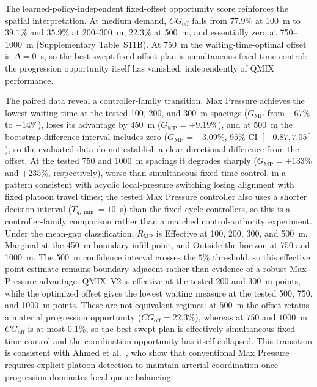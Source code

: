 \documentclass[review,12pt]{elsarticle}
\begin{document}
The learned-policy-independent fixed-offset opportunity score reinforces the spatial interpretation. At medium demand, $CG_{\mathrm{off}}$ falls from $77.9\%$ at 100~m to $39.1\%$ and $35.9\%$ at 200--300~m, $22.3\%$ at 500~m, and essentially zero at 750--1000~m (Supplementary Table~S11B). At 750~m the waiting-time-optimal offset is $\Delta=0$~s, so the best swept fixed-offset plan is simultaneous fixed-time control: the progression opportunity itself has vanished, independently of QMIX performance.

The paired data reveal a controller-family transition. Max Pressure achieves the lowest waiting time at the tested 100, 200, and 300~m spacings ($G_{\mathrm{MP}}$ from $-67\%$ to $-14\%$), loses its advantage by $450$~m ($G_{\mathrm{MP}}=+9.19\%$), and at $500$~m the bootstrap difference interval includes zero ($G_{\mathrm{MP}}=+3.09\%$, $95\%$ CI $[-0.87, 7.05]$), so the evaluated data do not establish a clear directional difference from the offset. At the tested 750 and 1000~m spacings it degrades sharply ($G_{\mathrm{MP}}=+133\%$ and $+235\%$, respectively), worse than simultaneous fixed-time control, in a pattern consistent with acyclic local-pressure switching losing alignment with fixed platoon travel times; the tested Max Pressure controller also uses a shorter decision interval ($T_{g,\min}=10$~s) than the fixed-cycle controllers, so this is a controller-family comparison rather than a matched control-authority experiment. Under the mean-gap classification, $R_{\mathrm{MP}}$ is Effective at 100, 200, 300, and 500~m, Marginal at the 450~m boundary-infill point, and Outside the horizon at 750 and 1000~m. The 500~m confidence interval crosses the $5\%$ threshold, so this effective point estimate remains boundary-adjacent rather than evidence of a robust Max Pressure advantage. QMIX~V2 is effective at the tested 200 and 300~m points, while the optimized offset gives the lowest waiting measure at the tested 500, 750, and 1000~m points. These are not equivalent regimes: at $500$~m the offset retains a material progression opportunity ($CG_{\mathrm{off}}=22.3\%$), whereas at $750$ and $1000$~m $CG_{\mathrm{off}}$ is at most $0.1\%$, so the best swept plan is effectively simultaneous fixed-time control and the coordination opportunity has itself collapsed. This transition is consistent with Ahmed et al.~\cite{ahmed2025cmp}, who show that conventional Max Pressure requires explicit platoon detection to maintain arterial coordination once progression dominates local queue balancing.
\end{document}
